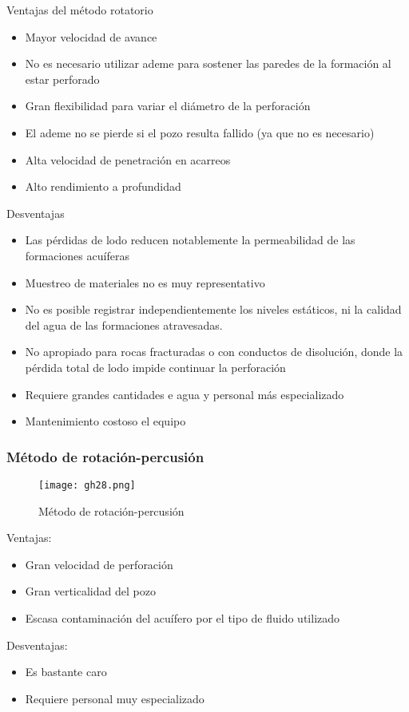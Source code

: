 
Ventajas del método rotatorio
\begin{itemize}
    \item Mayor velocidad de avance
    \item No es necesario utilizar ademe para sostener las paredes de la formación al estar perforado
    \item Gran flexibilidad para variar el diámetro de la perforación
    \item El ademe no se pierde si el pozo resulta fallido (ya que no es necesario)
    \item Alta velocidad de penetración en acarreos
    \item Alto rendimiento a profundidad
\end{itemize}
Desventajas
\begin{itemize}
    \item Las pérdidas de lodo reducen notablemente la permeabilidad de las formaciones acuíferas
    \item Muestreo de materiales no es muy representativo
    \item No es posible registrar independientemente los niveles estáticos, ni la calidad del agua de las formaciones atravesadas.
    \item No apropiado para rocas fracturadas o con conductos de disolución, donde la pérdida total de lodo impide continuar la perforación
    \item Requiere grandes cantidades e agua y personal más especializado
    \item Mantenimiento costoso el equipo
\end{itemize}
\subsubsection{Método de rotación-percusión}
\begin{figure}[h!]
\centering
  \texttt{[image: gh28.png]}
  \caption{Método de rotación-percusión}
  \label{gh28}
\end{figure}
Ventajas:
\begin{itemize}
    \item Gran velocidad de perforación
    \item Gran verticalidad del pozo
    \item Escasa contaminación del acuífero por el tipo de fluido utilizado
\end{itemize}
Desventajas:
\begin{itemize}
    \item Es bastante caro
    \item Requiere personal muy especializado
\end{itemize}
